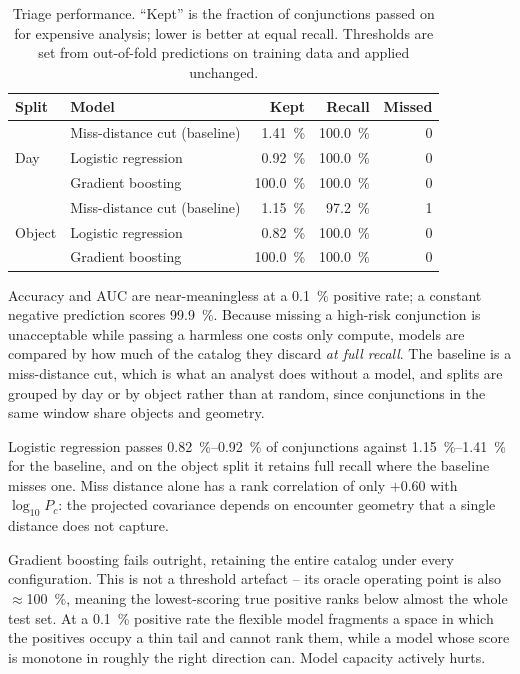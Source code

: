 \documentclass[11pt]{article}
\newcommand{\Pc}{P_c}
\begin{document}
\begin{table}[htbp]
\centering
\caption{Triage performance. ``Kept'' is the fraction of conjunctions passed
         on for expensive analysis; lower is better at equal recall.
         Thresholds are set from out-of-fold predictions on training data
         and applied unchanged.}
\label{tab:triage}
\begin{tabular}{llrrr}
\toprule
Split & Model & Kept & Recall & Missed \\
\midrule
\multirow{3}{*}{Day}
 & Miss-distance cut (baseline) & \SI{1.41}{\percent} & \SI{100.0}{\percent} & 0 \\
 & Logistic regression          & \SI{0.92}{\percent} & \SI{100.0}{\percent} & 0 \\
 & Gradient boosting            & \SI{100.0}{\percent} & \SI{100.0}{\percent} & 0 \\
\midrule
\multirow{3}{*}{Object}
 & Miss-distance cut (baseline) & \SI{1.15}{\percent} & \SI{97.2}{\percent}  & 1 \\
 & Logistic regression          & \SI{0.82}{\percent} & \SI{100.0}{\percent} & 0 \\
 & Gradient boosting            & \SI{100.0}{\percent} & \SI{100.0}{\percent} & 0 \\
\bottomrule
\end{tabular}
\end{table}

Accuracy and AUC are near-meaningless at a \SI{0.1}{\percent} positive rate;
a constant negative prediction scores \SI{99.9}{\percent}. Because missing a
high-risk conjunction is unacceptable while passing a harmless one costs
only compute, models are compared by how much of the catalog they discard
\emph{at full recall}. The baseline is a miss-distance cut, which is what an
analyst does without a model, and splits are grouped by day or by object
rather than at random, since conjunctions in the same window share objects
and geometry.

Logistic regression passes \SIrange{0.82}{0.92}{\percent} of conjunctions
against \SIrange{1.15}{1.41}{\percent} for the baseline, and on the object
split it retains full recall where the baseline misses one. Miss distance
alone has a rank correlation of only $+0.60$ with $\log_{10}\Pc$: the
projected covariance depends on encounter geometry that a single distance
does not capture.

Gradient boosting fails outright, retaining the entire catalog under every
configuration. This is not a threshold artefact -- its oracle operating
point is also $\approx$\SI{100}{\percent}, meaning the lowest-scoring true
positive ranks below almost the whole test set. At a \SI{0.1}{\percent}
positive rate the flexible model fragments a space in which the positives
occupy a thin tail and cannot rank them, while a model whose score is
monotone in roughly the right direction can. Model capacity actively hurts.
\end{document}
